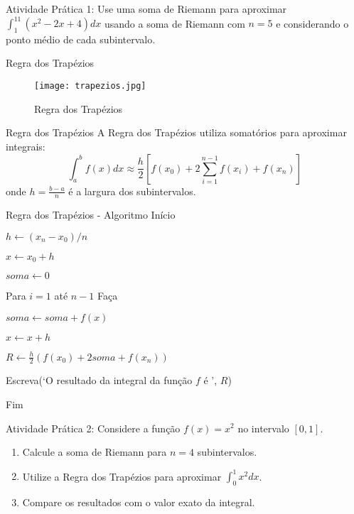 \documentclass{beamer}
\begin{document}
\begin{frame}{Atividade Prática 1:}
    Use uma soma de Riemann para aproximar \( \displaystyle \int_{1}^{11} (x^2 - 2x + 4) dx \) usando a soma de Riemann com \( n=5 \) e considerando o ponto médio de cada subintervalo.

\end{frame}

\begin{frame}{Regra dos Trapézios}

\begin{figure}
    \centering
    \texttt{[image: trapezios.jpg]}
    \caption{Regra dos Trapézios}
    \label{fig:my_label}
\end{figure}

\end{frame}


\begin{frame}{Regra dos Trapézios}
    A Regra dos Trapézios utiliza somatórios para aproximar integrais:
    \[
        \int_{a}^{b} f(x) dx \approx 
        \frac{h}{2} [f(x_0)+2\sum_{i=1}^{n-1} f(x_i) + f(x_n)]
    \]
    onde \( h = \frac{b-a}{n} \) é a largura dos subintervalos.
\end{frame}


\begin{frame}{Regra dos Trapézios - Algoritmo}
Início

\hspace{0.5cm} $h \leftarrow (x_n - x_0) / n$

\hspace{0.5cm} $x \leftarrow x_0 + h$

\hspace{0.5cm} $soma \leftarrow 0$

\hspace{0.5cm} Para $i = 1$ até $n - 1$ Faça

\hspace{1.3cm} $soma \leftarrow soma + f(x)$

\hspace{1.3cm} $x \leftarrow x + h$

\hspace{0.5cm} $R \leftarrow \frac{h}{2} \left(f(x_0)  + 2soma + f(x_n) \right)$

Escreva(‘O resultado da integral da função $f$ é ’, $R$)

Fim
\end{frame}


\begin{frame}{Atividade Prática 2:}
    Considere a função \( f(x) = x^2 \) no intervalo \([0,1]\).
    \begin{enumerate}
        \item Calcule a soma de Riemann para \( n = 4 \) subintervalos.
        \item Utilize a Regra dos Trapézios para aproximar \( \int_{0}^{1} x^2 dx \).
        \item Compare os resultados com o valor exato da integral.
    \end{enumerate}
\end{frame}
\end{document}
